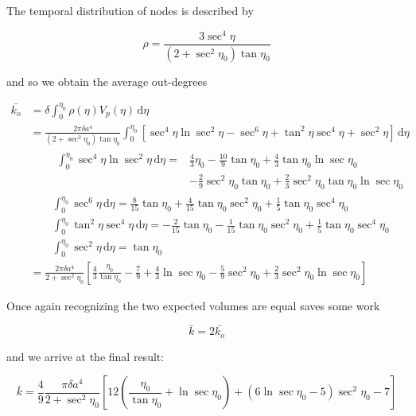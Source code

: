 \documentclass[preprint,notitlepage,amsmath,amssymb,floatfix]{revtex4-1}
\begin{document}
\noindent The temporal distribution of nodes is described by

\begin{equation}
\label{eq:rhoeta3}
\rho = \frac{3\sec^4\eta}{\left(2+\sec^2\eta_0\right)\tan\eta_0}
\end{equation}

\noindent and so we obtain the average out-degrees

\begin{align}
\bar{k_o} &= \delta\int_0^{\eta_0}\!\rho\left(\eta\right)V_p\left(\eta\right)\,\mathrm d\eta \\
  &= \frac{2\pi\delta a^4}{\left(2+\sec^2\eta_0\right)\tan\eta_0}\int_0^{\eta_0}\!\left[\sec^4\eta\ln\sec^2\eta - \sec^6\eta + \tan^2\eta\sec^4\eta+\sec^2\eta\right]\,\mathrm d\eta \\
  &\qquad\begin{aligned}
    \int_0^{\eta_0}\!\sec^4\eta\ln\sec^2\eta\,\mathrm d\eta = &\frac{4}{3}\eta_0 - \frac{10}{9}\tan\eta_0 + \frac{4}{3}\tan\eta_0\ln\sec\eta_0 \\
    &-\frac{2}{9}\sec^2\eta_0\tan\eta_0 + \frac{2}{3}\sec^2\eta_0\tan\eta_0\ln\sec\eta_0
  \end{aligned} \\
  &\qquad\int_0^{\eta_0}\!\sec^6\eta\,\mathrm d\eta = \frac{8}{15}\tan\eta_0 + \frac{4}{15}\tan\eta_0\sec^2\eta_0 + \frac{1}{5}\tan\eta_0\sec^4\eta_0 \\
  &\qquad\int_0^{\eta_0}\!\tan^2\eta\sec^4\eta\,\mathrm d\eta = -\frac{2}{15}\tan\eta_0 - \frac{1}{15}\tan\eta_0\sec^2\eta_0 + \frac{1}{5}\tan\eta_0\sec^4\eta_0 \\
  &\qquad\int_0^{\eta_0}\!\sec^2\eta\,\mathrm d\eta = \tan\eta_0 \\
  &=\frac{2\pi\delta a^4}{2+\sec^2\eta_0}\left[\frac{4}{3}\frac{\eta_0}{\tan\eta_0} - \frac{7}{9} + \frac{4}{3}\ln\sec\eta_0 - \frac{5}{9}\sec^2\eta_0 + \frac{2}{3}\sec^2\eta_0\ln\sec\eta_0\right]
\end{align}

\noindent Once again recognizing the two expected volumes are equal saves some work

\begin{equation}
\bar{k} = 2\bar{k_o}
\end{equation}

\noindent and we arrive at the final result:

\begin{equation}
\label{eq:finalk3}
\bar k = \frac{4}{9}\frac{\pi\delta a^4}{2+\sec^2\eta_0}\left[12\left(\frac{\eta_0}{\tan\eta_0}+\ln\sec\eta_0\right)+\left(6\ln\sec\eta_0-5\right)\sec^2\eta_0-7\right]
\end{equation}
\end{document}
